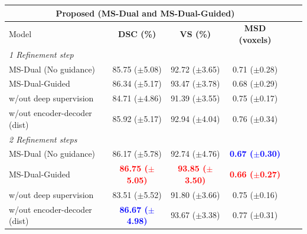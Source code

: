\documentclass[journal]{IEEEtran}
\begin{document}
\begin{table}[ht!]
\centering
\scriptsize
\begin{tabular}{lcccc|c}\\
\toprule
\multicolumn{4}{c}{Proposed (MS-Dual and MS-Dual-Guided)} \\
\midrule
Model & \textbf{DSC (\%)} & \textbf{VS (\%)} & \textbf{MSD (voxels)}  \\
\midrule
\multicolumn{4}{l}{\textit{1 Refinement step}} \\
MS-Dual (No guidance)  & 85.75 ($\pm$5.08)& 92.72 ($\pm$3.65) & 0.71 ($\pm$0.28)\\
MS-Dual-Guided   & 86.34 ($\pm$5.17) & 93.47 ($\pm$3.78) & 0.68 ($\pm$0.29) \\
w/out deep supervision    & 84.71 ($\pm$4.86)  & 91.39 ($\pm$3.55) & 0.75 ($\pm$0.17) \\
w/out encoder-decoder (dist) &  85.92 ($\pm$5.17)  & 92.94 ($\pm$4.04) & 0.76 ($\pm$0.34)\\

\midrule
\multicolumn{4}{l}{\textit{2 Refinement steps}} \\
MS-Dual (No guidance)   & 86.17 ($\pm$5.78) & 92.74 ($\pm$4.76) &  \textcolor{blue}{\textbf{0.67 ($\pm$0.30)}}\\
MS-Dual-Guided   &  \textcolor{red}{\textbf{86.75 ($\pm$5.05)}} & \textcolor{red}{\textbf{93.85 ($\pm$3.50)}} &  \textcolor{red}{\textbf{0.66 ($\pm$0.27)}}\\
w/out deep supervision   & 83.51 ($\pm$5.52) &  91.80 ($\pm$3.66)& 0.75 ($\pm$0.16)\\
w/out encoder-decoder (dist)   &  \textcolor{blue}{\textbf{86.67 ($\pm$4.98)}}  & 93.67 ($\pm$3.38) & 0.77 ($\pm$0.31) \\


\end{tabular}
\end{table}
\end{document}
